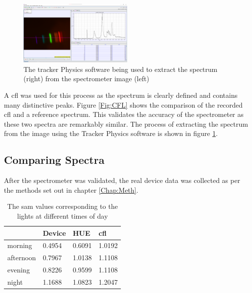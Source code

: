 \begin{figure}[b]
\centering
\includegraphics[width=0.5\textwidth]{images/CalibrationTracker.png}
\caption{The tracker Physics software being used to extract the spectrum (right) from the spectrometer image (left)}
\label{Fig:process}
\end{figure}


A \acrfull{cfl} was used for this process as the spectrum is clearly defined and contains many distinctive peaks. Figure \ref{Fig:CFL} shows the comparison of the recorded \acrshort{cfl} and a reference spectrum. This validates the accuracy of the spectrometer as these two spectra are remarkably similar. The process of extracting the spectrum from the image using the Tracker Physics software is shown in figure \ref{Fig:process}.

\subsection{Comparing Spectra}

After the spectrometer was validated, the real device data was collected as per the methods set out in chapter \ref{Chap:Meth}. 

\begin{table}[bt]
\centering
\begin{tabular}{l|lll}
          			& Device & HUE    & \acrshort{cfl} \\\hline
\acrfull{morning}   & 0.4954 & 0.6091 & 1.0192 \\
\acrfull{afternoon} & 0.7967 & 1.0138 & 1.1108 \\
\acrfull{evening}   & 0.8226 & 0.9599 & 1.1108 \\
\acrfull{night}     & 1.1688 & 1.0823 & 1.2047
\end{tabular}
\caption{The \acrshort{sam} values corresponding to the lights at different times of day}
\label{Tab:SAM}
\end{table}


